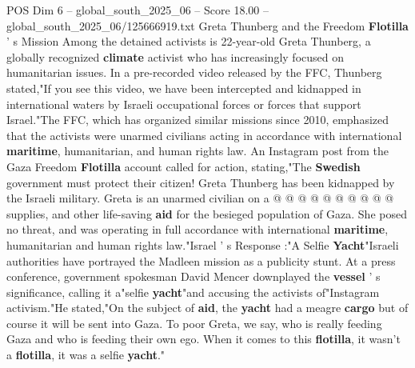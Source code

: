 \begin{textsample}{POS Dim 6 – global\_south\_2025\_06 – Score 18.00 – global\_south\_2025\_06/125666919.txt}
Greta Thunberg and the Freedom \textbf{Flotilla} ' s Mission Among the detained activists is 22-year-old Greta Thunberg, a globally recognized \textbf{climate} activist who has increasingly focused on humanitarian issues.
In a pre-recorded video released by the FFC, Thunberg stated,"If you see this video, we have been intercepted and kidnapped in international waters by Israeli occupational forces or forces that support Israel."The FFC, which has organized similar missions since 2010, emphasized that the activists were unarmed civilians acting in accordance with international \textbf{maritime}, humanitarian, and human rights law.
An Instagram post from the Gaza Freedom \textbf{Flotilla} account called for action, stating,"The \textbf{Swedish} government must protect their citizen!
Greta Thunberg has been kidnapped by the Israeli military.
Greta is an unarmed civilian on a @ @ @ @ @ @ @ @ @ @ supplies, and other life-saving \textbf{aid} for the besieged population of Gaza.
She posed no threat, and was operating in full accordance with international \textbf{maritime}, humanitarian and human rights law."Israel ' s Response :"A Selfie \textbf{Yacht}"Israeli authorities have portrayed the Madleen mission as a publicity stunt.
At a press conference, government spokesman David Mencer downplayed the \textbf{vessel} ' s significance, calling it a"selfie \textbf{yacht}"and accusing the activists of"Instagram activism."He stated,"On the subject of \textbf{aid}, the \textbf{yacht} had a meagre \textbf{cargo} but of course it will be sent into Gaza.
To poor Greta, we say, who is really feeding Gaza and who is feeding their own ego.
When it comes to this \textbf{flotilla}, it wasn't a \textbf{flotilla}, it was a selfie \textbf{yacht}."

\end{textsample}
